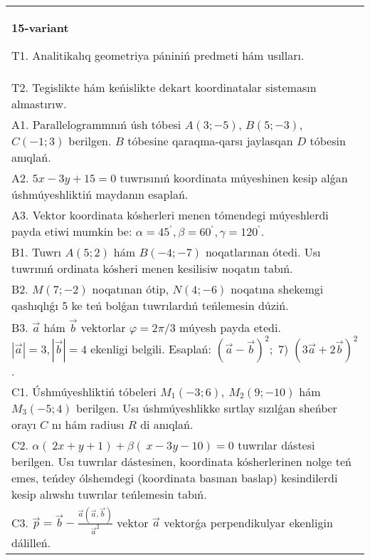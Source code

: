 \documentclass{article}
\begin{document}
\begin{tabular}{m{17cm}}
\textbf{15-variant}
\newline

T1. Analitikalıq geometriya pániniń predmeti hám usılları. 
 \\
T2. Tegislikte hám keńislikte dekart koordinatalar sistemasın almastırıw. 
 \\
A1. 
Parallelogrammnıń úsh tóbesi
$A(3;-5)$, $B(5;-3)$, $C(-1;3)$ berilgen. $B$ tóbesine
qaraqma-qarsı jaylasqan $D$ tóbesin anıqlań.
 \\
A2. 
$5x-3y+15=0$ tuwrısınıń koordinata múyeshinen
kesip alǵan úshmúyeshliktiń maydanın esaplań.
 \\
A3. Vektor koordinata kósherleri menen tómendegi múyeshlerdi payda etiwi mumkin be:
$\alpha = 45^{{^\circ}},\beta = 60^{{^\circ}},\gamma = 120^{{^\circ}}$. 
 \\
B1. 
Tuwrı \(A(5;2)\) hám \(B( -4; -7)\) noqatlarınan ótedi.
Usı tuwrınıń ordinata kósheri menen kesilisiw noqatın tabıń.
 \\
B2. 
\(M(7;-2)\) noqatınan ótip, \(N(4;-6)\) noqatına
shekemgi qashıqlıǵı 5 ke teń bolǵan tuwrılardıń teńlemesin dúziń.
 \\
B3. 
$\vec{a}$ hám $\vec{b}$ vektorlar $\varphi = 2\pi/3$ múyesh payda etedi. $|\vec{a}| = 3,|\vec{b}| = 4$ ekenligi belgili. Esaplań: 
$(\vec{a} - \vec{b}) ^{2};$ 7) $(3\vec{a} + 2\vec{b}) ^{2}$.
 \\
C1. 
Úshmúyeshliktiń tóbeleri \(M_{1}( - 3;6),\ M_{2}(9; - 10)\) 
hám \(M_{3}( - 5;4)\) berilgen. Usı úshmúyeshlikke sırtlay sızılǵan
sheńber orayı $C$ nı hám radiusı $R$ di anıqlań.
 \\
C2. 
\(\alpha (\ 2x + y + 1) + \beta(\ x - 3y - 10) = 0\) 
tuwrılar dástesi berilgen. Usı tuwrılar dástesinen, koordinata
kósherlerinen nolge teń emes, teńdey ólshemdegi (koordinata basınan
baslap) kesindilerdi kesip alıwshı tuwrılar teńlemesin tabıń.
 \\
C3. 
\(\vec{p} = \vec{b} - \frac{\vec{a} (\vec{a},\vec{b}) }{{\vec{a}}^{2}}\) vektor \(\vec{a}\) vektorǵa perpendikulyar ekenligin dálilleń.
 \\

\end{tabular}
\vspace{1cm}
\end{document}
